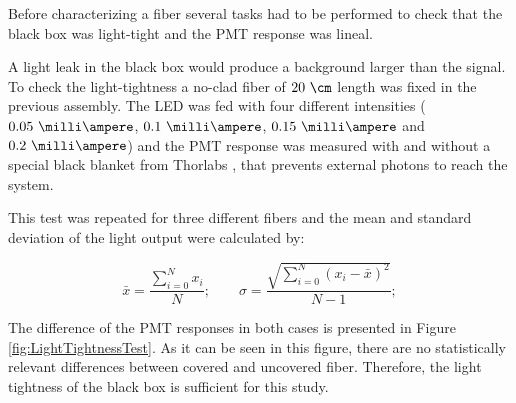 
Before characterizing a fiber several tasks had to be performed to check that the black box was light-tight and the PMT response was lineal.


A light leak in the black box would produce a background larger than the signal. To check the light-tightness a no-clad fiber of $20~\cm$ length was fixed in the previous assembly. The LED was fed with four different intensities ($0.05~\milli\ampere$, $0.1~\milli\ampere$, $0.15~\milli\ampere$ and $0.2~\milli\ampere$) and the PMT response was measured with and without a special black blanket from Thorlabs \cite{BlackBlancket}, that prevents external photons to reach the system. 

This test was repeated for three different fibers and the mean and standard deviation of the light output were calculated by:

\begin{equation}
\bar{x}=\frac{\sum_{i=0}^{N}x_i}{N}; \qquad \sigma = \frac{\sqrt{\sum_{i=0}^{N}(x_i-\bar{x})^2}}{N-1};
\label{eq:MeanAndStandardDesviation}
\end{equation}

The difference of the PMT responses in both cases is presented in Figure \ref{fig:LightTightnessTest}. As it can be seen in this figure, there are no statistically relevant differences between covered and uncovered fiber. Therefore, the light tightness of the black box is sufficient for this study.



